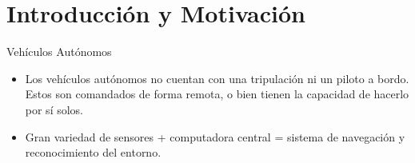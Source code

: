 \section{Introducción y Motivación}

\begin{frame}{Vehículos Autónomos}
	\begin{itemize}
		\item <2->Los vehículos autónomos no cuentan con una tripulación ni un piloto a bordo. Estos son comandados de forma remota, o bien tienen la capacidad de hacerlo por sí solos.
		\item <3->Gran variedad de sensores + computadora central = sistema de navegación y reconocimiento del entorno.
	\end{itemize}
	\begin{center}
	\end{center}
\end{frame}

